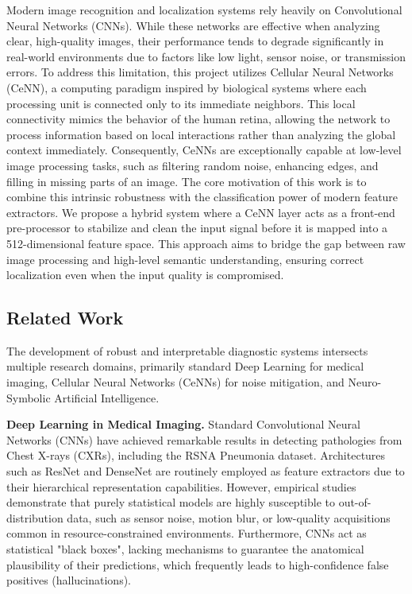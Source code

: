\documentclass[a4paper,fleqn]{cas-dc}
\begin{document}
Modern image recognition and localization systems rely heavily on Convolutional Neural Networks (CNNs). While these networks are effective when analyzing clear, high-quality images, their performance tends to degrade significantly in real-world environments due to factors like low light, sensor noise, or transmission errors. To address this limitation, this project utilizes Cellular Neural Networks (CeNN), a computing paradigm inspired by biological systems where each processing unit is connected only to its immediate neighbors. This local connectivity mimics the behavior of the human retina, allowing the network to process information based on local interactions rather than analyzing the global context immediately. Consequently, CeNNs are exceptionally capable at low-level image processing tasks, such as filtering random noise, enhancing edges, and filling in missing parts of an image. The core motivation of this work is to combine this intrinsic robustness with the classification power of modern feature extractors. We propose a hybrid system where a CeNN layer acts as a front-end pre-processor to stabilize and clean the input signal before it is mapped into a 512-dimensional feature space. This approach aims to bridge the gap between raw image processing and high-level semantic understanding, ensuring correct localization even when the input quality is compromised.

\subsection{Related Work}
The development of robust and interpretable diagnostic systems intersects multiple research domains, primarily standard Deep Learning for medical imaging, Cellular Neural Networks (CeNNs) for noise mitigation, and Neuro-Symbolic Artificial Intelligence.

\textbf{Deep Learning in Medical Imaging.} Standard Convolutional Neural Networks (CNNs) have achieved remarkable results in detecting pathologies from Chest X-rays (CXRs), including the RSNA Pneumonia dataset. Architectures such as ResNet and DenseNet \cite{densenet} are routinely employed as feature extractors due to their hierarchical representation capabilities. However, empirical studies demonstrate that purely statistical models are highly susceptible to out-of-distribution data, such as sensor noise, motion blur, or low-quality acquisitions common in resource-constrained environments. Furthermore, CNNs act as statistical "black boxes", lacking mechanisms to guarantee the anatomical plausibility of their predictions, which frequently leads to high-confidence false positives (hallucinations).
\end{document}
